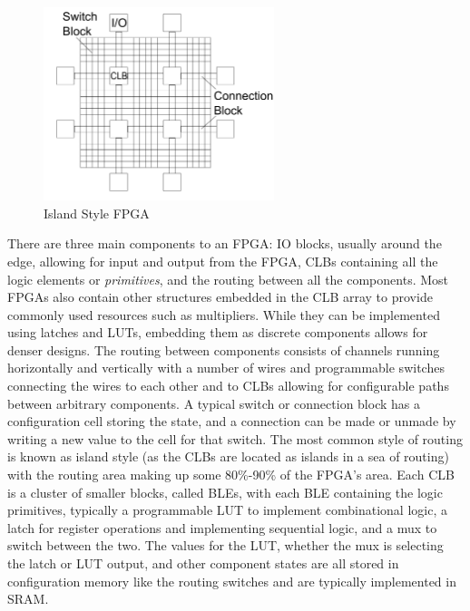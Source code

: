 \documentclass[12pt,final,oneside]{dwThesis} %
\begin{document}
\begin{figure}
    \begin{center}
        \includegraphics[width=0.6\textwidth]{images/ArchFull.pdf}
        \caption{Island Style FPGA}
        \label{FPGAArch}
    \end{center}
\end{figure}

There are three main components to an \ac{FPGA}: \ac{IO} blocks, usually around the edge, allowing for input and output from the \ac{FPGA}, \acp{CLB} containing all the logic elements or \emph{primitives}, and the routing between all the components.
Most \acp{FPGA} also contain other structures embedded in the \ac{CLB} array to provide commonly used resources such as multipliers. While they can be implemented using latches and \acp{LUT}, embedding them as discrete components allows for denser designs.
The routing between components consists of channels running horizontally and vertically with a number of wires and programmable switches connecting the wires to each other and to \acp{CLB} allowing for configurable paths between arbitrary components. A typical switch or connection block has a configuration cell storing the state, and a connection can be made or unmade by writing a new value to the cell for that switch. The most common style of routing is known as island style (as the \acp{CLB} are located as islands in a sea of routing) with the routing area making up some 80\%-90\% of the \ac{FPGA}'s area\cite{FPGAArch}.
Each \ac{CLB} is a cluster of smaller blocks, called \acp{BLE}, with each \ac{BLE} containing the logic primitives, typically a programmable \ac{LUT} to implement combinational logic, a latch for register operations and implementing sequential logic, and a \ac{mux} to switch between the two. The values for the \ac{LUT}, whether the \ac{mux} is selecting the latch or \ac{LUT} output, and other component states are all stored in configuration memory like the routing switches and are typically implemented in \acs{SRAM}.
\end{document}
